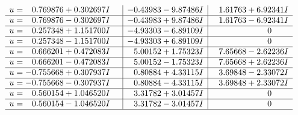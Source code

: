 \documentclass[1p]{elsarticle_modified}
\theoremstyle{definition}
\begin{document}
$$\begin{array}{c|c|c}
\begin{aligned}
u &= \phantom{-}0.769876 + 0.302697 I\end{aligned}
 & -0.43983 - 9.87486 I & \phantom{-}1.61763 + 6.92341 I \\ \hline\begin{aligned}
u &= \phantom{-}0.769876 - 0.302697 I\end{aligned}
 & -0.43983 + 9.87486 I & \phantom{-}1.61763 - 6.92341 I \\ \hline\begin{aligned}
u &= \phantom{-}0.257348 + 1.151700 I\end{aligned}
 & -4.93303 - 6.89109 I & \phantom{-0.000000 } 0 \\ \hline\begin{aligned}
u &= \phantom{-}0.257348 - 1.151700 I\end{aligned}
 & -4.93303 + 6.89109 I & \phantom{-0.000000 } 0 \\ \hline\begin{aligned}
u &= \phantom{-}0.666201 + 0.472083 I\end{aligned}
 & \phantom{-}5.00152 + 1.75323 I & \phantom{-}7.65668 - 2.62236 I \\ \hline\begin{aligned}
u &= \phantom{-}0.666201 - 0.472083 I\end{aligned}
 & \phantom{-}5.00152 - 1.75323 I & \phantom{-}7.65668 + 2.62236 I \\ \hline\begin{aligned}
u &= -0.755668 + 0.307937 I\end{aligned}
 & \phantom{-}0.80884 + 4.33115 I & \phantom{-}3.69848 - 2.33072 I \\ \hline\begin{aligned}
u &= -0.755668 - 0.307937 I\end{aligned}
 & \phantom{-}0.80884 - 4.33115 I & \phantom{-}3.69848 + 2.33072 I \\ \hline\begin{aligned}
u &= \phantom{-}0.560154 + 1.046520 I\end{aligned}
 & \phantom{-}3.31782 + 3.01457 I & \phantom{-0.000000 } 0 \\ \hline\begin{aligned}
u &= \phantom{-}0.560154 - 1.046520 I\end{aligned}
 & \phantom{-}3.31782 - 3.01457 I & \phantom{-0.000000 } 0\\
 \hline 
 \end{array}$$\newpage$$\begin{array}{c|c|c}  

\end{array}$$
\end{document}
